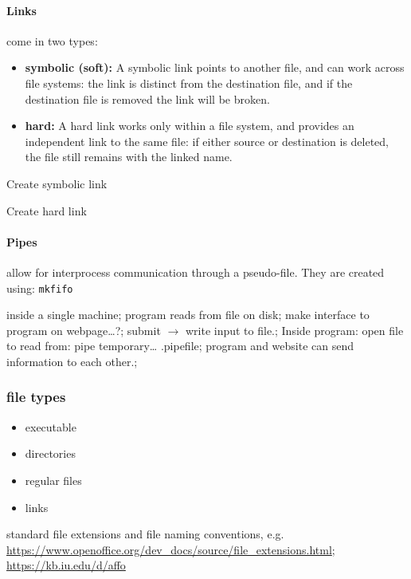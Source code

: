 \documentclass{article}
\begin{document}
\paragraph{Links} come in two types:
\begin{itemize}
    \item {\bf symbolic (soft):}
        A symbolic link points to another file, and
        can work across file systems: the link is distinct from the
        destination file, and if the destination file is removed the link will
        be broken.
    \item {\bf hard:}
        A hard link works only within a file system, and provides
        an independent link to the same file: if either source or destination
        is deleted, the file still remains with the linked name.
\end{itemize}
\begin{description}[labelwidth=17em]
    \item [> ln -s \{source\} \{destination\}] Create symbolic link
    \item [> ln \{source\} \{destination\}] Create hard link
\end{description}

\paragraph{Pipes} allow for interprocess communication through a pseudo-file.
They are created using: \verb|mkfifo|

\textcolor{myGreen}{inside a single machine;
program reads from file on disk;
make interface to program on webpage\ldots?;
submit $\rightarrow$ write input to file.;
Inside program: open file to read from: pipe temporary… .pipefile;
program and website can send information to each other.;
}

\subsubsection{file types}
\begin{itemize}
    \item executable
    \item directories
    \item regular files
    \item links
\end{itemize}

standard file extensions and file naming conventions, e.g.
\url{https://www.openoffice.org/dev_docs/source/file_extensions.html};
\url{https://kb.iu.edu/d/affo}
\end{document}
